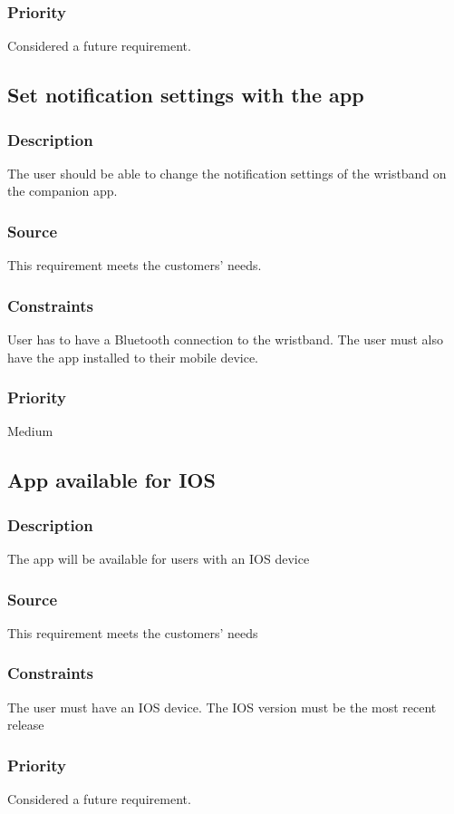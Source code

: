 \subsubsection{Priority}
Considered a future requirement.

\subsection{Set notification settings with the app}
\subsubsection{Description}
The user should be able to change the notification settings of the wristband on the companion app.
\subsubsection{Source}
This requirement meets the customers' needs.
\subsubsection{Constraints}
User has to have a Bluetooth connection to the wristband. The user must also have the app installed to their mobile device.
\subsubsection{Priority}
Medium

\subsection{App available for IOS}
\subsubsection{Description}
The app will be available for users with an IOS device
\subsubsection{Source}
This requirement meets the customers' needs
\subsubsection{Constraints}
The user must have an IOS device. The IOS version must be the most recent release 
\subsubsection{Priority}
Considered a future requirement.

